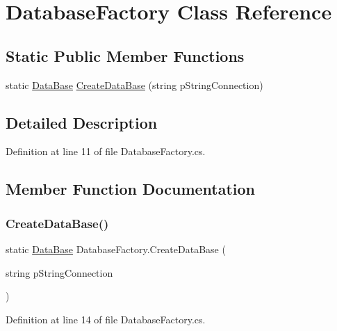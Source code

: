 \hypertarget{class_database_factory}{}\section{Database\+Factory Class Reference}
\label{class_database_factory}
\subsection*{Static Public Member Functions}
\begin{DoxyCompactItemize}
\item 
static \hyperlink{class_data_base}{Data\+Base} \hyperlink{class_database_factory_af9abd1d335ada61ef9fe450a97d4a9b5}{Create\+Data\+Base} (string p\+String\+Connection)
\end{DoxyCompactItemize}


\subsection{Detailed Description}


Definition at line 11 of file Database\+Factory.\+cs.



\subsection{Member Function Documentation}
\hypertarget{class_database_factory_af9abd1d335ada61ef9fe450a97d4a9b5}{}\label{class_database_factory_af9abd1d335ada61ef9fe450a97d4a9b5} 
\subsubsection{\texorpdfstring{Create\+Data\+Base()}{CreateDataBase()}}
{\footnotesize\ttfamily static \hyperlink{class_data_base}{Data\+Base} Database\+Factory.\+Create\+Data\+Base (\begin{DoxyParamCaption}\item[{string}]{p\+String\+Connection }\end{DoxyParamCaption})\hspace{0.3cm}{\ttfamily [static]}}



Definition at line 14 of file Database\+Factory.\+cs.


